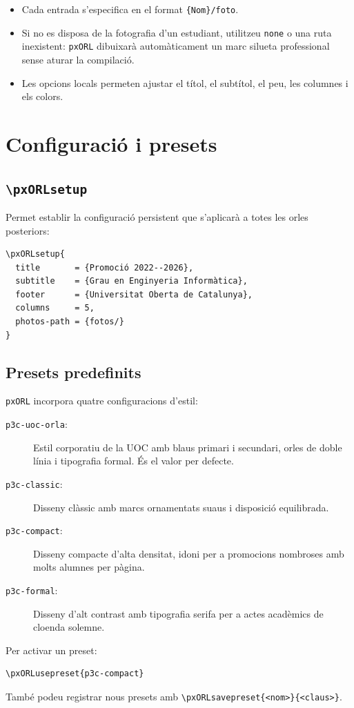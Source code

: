\documentclass[11pt,a4paper]{article}
\begin{document}
\begin{itemize}
  \item Cada entrada s'especifica en el format \texttt{\{Nom\}/foto}.
  \item Si no es disposa de la fotografia d'un estudiant, utilitzeu \texttt{none} o una ruta inexistent: \texttt{pxORL} dibuixar\`a autom\`aticament un marc silueta professional sense aturar la compilaci\'o.
  \item Les opcions locals permeten ajustar el t\'itol, el subt\'itol, el peu, les columnes i els colors.
\end{itemize}

\section{Configuraci\'o i presets}

\subsection{\texttt{\textbackslash pxORLsetup}}

Permet establir la configuraci\'o persistent que s'aplicar\`a a totes les orles posteriors:

\begin{verbatim}
\pxORLsetup{
  title       = {Promoció 2022--2026},
  subtitle    = {Grau en Enginyeria Informàtica},
  footer      = {Universitat Oberta de Catalunya},
  columns     = 5,
  photos-path = {fotos/}
}
\end{verbatim}

\subsection{Presets predefinits}

\texttt{pxORL} incorpora quatre configuracions d'estil:

\begin{description}
  \item[\texttt{p3c-uoc-orla}:] Estil corporatiu de la UOC amb blaus primari i secundari, orles de doble l\'inia i tipografia formal. \'Es el valor per defecte.
  \item[\texttt{p3c-classic}:] Disseny cl\`assic amb marcs ornamentats suaus i disposici\'o equilibrada.
  \item[\texttt{p3c-compact}:] Disseny compacte d'alta densitat, idoni per a promocions nombroses amb molts alumnes per p\`agina.
  \item[\texttt{p3c-formal}:] Disseny d'alt contrast amb tipografia serifa per a actes acad\`emics de cloenda solemne.
\end{description}

Per activar un preset:

\begin{verbatim}
\pxORLusepreset{p3c-compact}
\end{verbatim}

Tamb\'e podeu registrar nous presets amb \texttt{\textbackslash pxORLsavepreset\{<nom>\}\{<claus>\}}.
\end{document}
